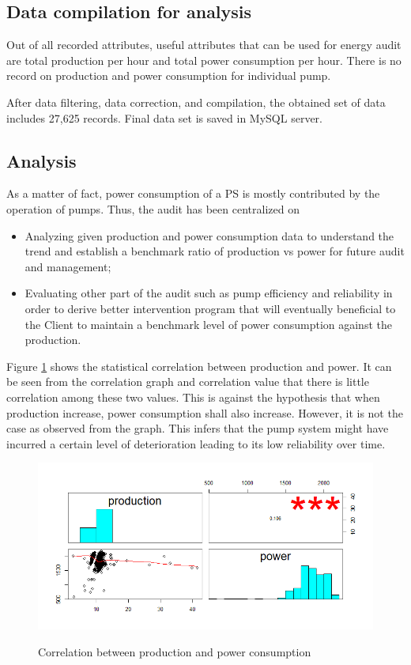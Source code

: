 \subsection{Data compilation for analysis}
Out of all recorded attributes, useful attributes that can be used for energy audit are total production per hour and total power consumption per hour. There is no record on production and power consumption for individual pump.

After data filtering, data correction, and compilation, the obtained set of data includes 27,625 records. Final data set is saved in MySQL server.

\subsection{Analysis}

As a matter of fact, power consumption of a PS is mostly contributed by the operation of pumps. Thus, the audit has been centralized on 
\begin{itemize}
	\item Analyzing given production and power consumption data to understand the trend and establish a benchmark ratio of production vs power for future audit and management;
	\item Evaluating other part of the audit such as pump efficiency and reliability in order to derive better intervention program that will eventually beneficial to the Client to maintain a benchmark level of power consumption against the production. 
\end{itemize}

Figure \ref{ch05_fig_energy_correlation} shows the statistical correlation between production and power. It can be seen from the correlation graph and correlation value that there is little correlation among these two values. This is against the  hypothesis that when production increase, power consumption shall also increase. However, it is not the case as observed from the graph. This infers that the pump system might have incurred a certain level of deterioration leading to its low reliability over time. 

\begin{figure}[!htb]
	\includegraphics[scale=0.6]{figures/ch05_fig_energy_correlation} \\
	\caption{Correlation between production and power consumption}
	\label{ch05_fig_energy_correlation} 
\end{figure}

